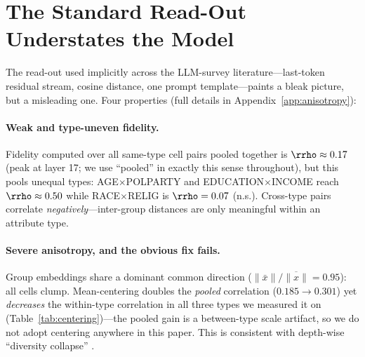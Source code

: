 \section{The Standard Read-Out Understates the Model}
\label{sec:act1}

The read-out used implicitly across the LLM-survey literature---last-token
residual stream, cosine distance, one prompt template---paints a bleak
picture, but a misleading one. Four properties (full details in
Appendix~\ref{app:anisotropy}):

\paragraph{Weak and type-uneven fidelity.}
Fidelity computed over all same-type cell pairs pooled together is
$\rrho\approx0.17$ (peak at layer 17; we use ``pooled'' in exactly this
sense throughout), but this pools unequal types: AGE$\times$POLPARTY and
EDUCATION$\times$INCOME reach $\rrho\approx0.50$ while
RACE$\times$RELIG is $\rrho=0.07$ (n.s.). %
Cross-type pairs correlate \emph{negatively}---inter-group distances are
only meaningful within an attribute type.

\paragraph{Severe anisotropy, and the obvious fix fails.}
Group embeddings share a dominant common direction
($\lVert\bar{x}\rVert / \overline{\lVert x\rVert} = 0.95$): all cells
clump. Mean-centering doubles the \emph{pooled} correlation
($0.185\!\to\!0.301$) yet \emph{decreases} the within-type correlation in
all three types we measured it on (Table~\ref{tab:centering})---the
pooled gain is a between-type scale artifact, so we do not adopt
centering anywhere in this paper. %
This is consistent with depth-wise ``diversity collapse''
\citep{divcollapse2026}.

